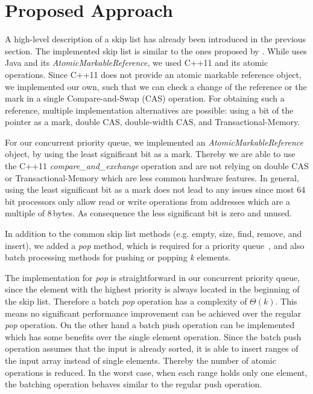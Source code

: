 \section{Proposed Approach}\label{sec:approach}
A high-level description of a skip list has already been introduced in the previous section. The implemented skip list is similar to the ones proposed by \cite{Herlihy:2008:AMP:1734069, Sundell:2005:FLC:1073765.1073770}. While \cite{Herlihy:2008:AMP:1734069} uses Java and its \textit{AtomicMarkableReference}, we used C++11 and its atomic operations. Since C++11 does not provide an atomic markable reference object, we implemented our own, such that we can check a change of the reference or the mark in a single Compare-and-Swap (CAS) operation. For obtaining such a reference, multiple implementation alternatives are possible: using a bit of the pointer as a mark, double CAS, double-width CAS, and Transactional-Memory.

For our concurrent priority queue, we implemented an \textit{AtomicMarkableReference} object, by using the least significant bit as a mark. Thereby we are able to use the C++11 {\em compare\_and\_exchange} operation and are not relying on double CAS or Transactional-Memory which are less common hardware features.
In general, using the least significant bit as a mark does not lead to any issues since most 64\,bit processors only allow read or write operations from addresses which are a multiple of 8\,bytes.
As consequence the less significant bit is zero and unused.

In addition to the common skip list methods (e.g. empty, size, find, remove, and insert), we added a \textit{pop} method, which is required for a priority queue~\cite{Herlihy:2008:AMP:1734069}, and also batch processing methods for pushing or popping \textit{k} elements.

The implementation for \textit{pop} is straightforward in our concurrent priority queue, since the element with the highest priority is always located in the beginning of the skip list.
Therefore a batch \textit{pop} operation has a complexity of $\Theta(k)$. This means no significant performance improvement can be achieved over the regular \textit{pop} operation. On the other hand a batch push operation can be implemented which has some benefits over the single element operation. Since the batch push operation assumes that the input is already sorted, it is able to insert ranges of the input array instead of single elements. Thereby the number of atomic operations is reduced. In the worst case, when each range holds only one element, the batching operation behaves similar to the regular push operation.

